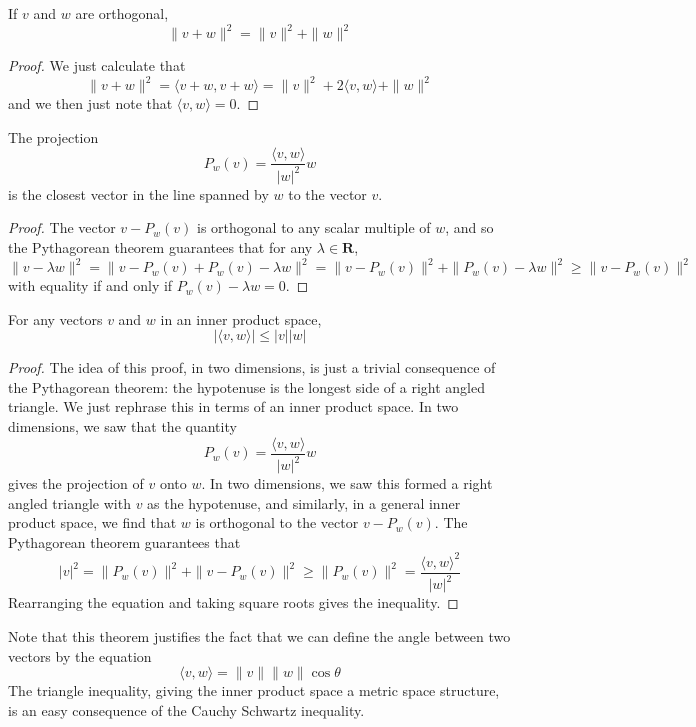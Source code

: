 \begin{theorem}
    If $v$ and $w$ are orthogonal,
    \[ \| v + w \|^2 = \| v \|^2 + \| w \|^2 \]
\end{theorem}
\begin{proof}
    We just calculate that
    \[ \| v + w \|^2 = \langle v + w, v + w \rangle = \| v \|^2 + 2 \langle v, w \rangle + \| w \|^2 \]
    and we then just note that $\langle v, w \rangle = 0$.
\end{proof}

\begin{corollary}
    The projection
    \[ P_w(v) = \frac{\langle v, w \rangle}{|w|^2} w \]
    is the closest vector in the line spanned by $w$ to the vector $v$.
\end{corollary}
\begin{proof}
    The vector $v - P_w(v)$ is orthogonal to any scalar multiple of $w$, and so the Pythagorean theorem guarantees that for any $\lambda \in \mathbf{R}$,
    \[ \| v - \lambda w \|^2 = \| v - P_w(v) + P_w(v) - \lambda w \|^2 = \| v - P_w(v) \|^2 + \| P_w(v) - \lambda w \|^2 \geq \| v - P_w(v) \|^2 \]
    with equality if and only if $P_w(v) - \lambda w = 0$.
\end{proof}

\begin{theorem}
    For any vectors $v$ and $w$ in an inner product space,
    \[ |\langle v, w \rangle| \leq |v||w| \]
\end{theorem}
\begin{proof}
    The idea of this proof, in two dimensions, is just a trivial consequence of the Pythagorean theorem: the hypotenuse is the longest side of a right angled triangle. We just rephrase this in terms of an inner product space. In two dimensions, we saw that the quantity
    \[ P_w(v) = \frac{\langle v, w \rangle}{|w|^2} w \]
    gives the projection of $v$ onto $w$. In two dimensions, we saw this formed a right angled triangle with $v$ as the hypotenuse, and similarly, in a general inner product space, we find that $w$ is orthogonal to the vector $v - P_w(v)$. The Pythagorean theorem guarantees that
    \[ |v|^2 = \| P_w(v) \|^2 + \| v - P_w(v) \|^2 \geq \| P_w(v) \|^2 = \frac{\langle v, w \rangle^2}{|w|^2} \]
    Rearranging the equation and taking square roots gives the inequality.
\end{proof}

Note that this theorem justifies the fact that we can define the angle between two vectors by the equation
%
\[ \langle v, w \rangle = \|v\| \|w\| \cos \theta \]
%
The triangle inequality, giving the inner product space a metric space structure, is an easy consequence of the Cauchy Schwartz inequality.

